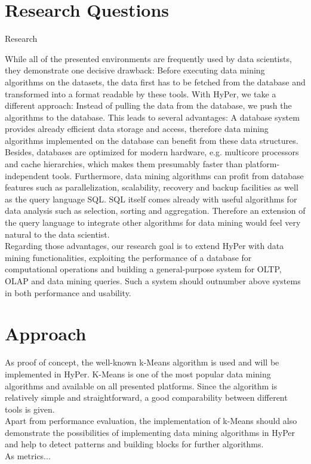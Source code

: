 \section{Research Questions}
Research 

While all of the presented environments are frequently used by data scientists, they demonstrate one decisive drawback: Before executing data mining algorithms on the datasets, the data first has to be fetched from the database and transformed into a format readable by these tools. With HyPer, we take a different approach: Instead of pulling the data from the database, we push the algorithms to the database. This leads to several advantages: A database system provides already efficient data storage and access, therefore data mining algorithms implemented on the database can benefit from these data structures. Besides, databases are optimized for modern hardware, e.g. multicore processors and cache hierarchies, which makes them presumably faster than platform-independent tools. Furthermore, data mining algorithms can profit from database features such as parallelization, scalability, recovery and backup facilities as well as the query language SQL. SQL itself comes already with useful algorithms for data analysis such as selection, sorting and aggregation. Therefore an extension of the query language to integrate other algorithms for data mining would feel very natural to the data scientist. 
\\
Regarding those advantages, our research goal is to extend HyPer with data mining functionalities, exploiting the performance of a database for computational operations and building a general-purpose system for OLTP, OLAP and data mining queries. Such a system should outnumber above systems in both performance and usability.


\section{Approach}
As proof of concept, the well-known k-Means algorithm is used and will be implemented in HyPer. K-Means is one of the most popular data mining algorithms and available on all presented platforms. Since the algorithm is relatively simple and straightforward, a good comparability between different tools is given. 
\\
Apart from performance evaluation, the implementation of k-Means should also demonstrate the possibilities of implementing data mining algorithms in HyPer and help to detect patterns and building blocks for further algorithms.
\\
As metrics...




